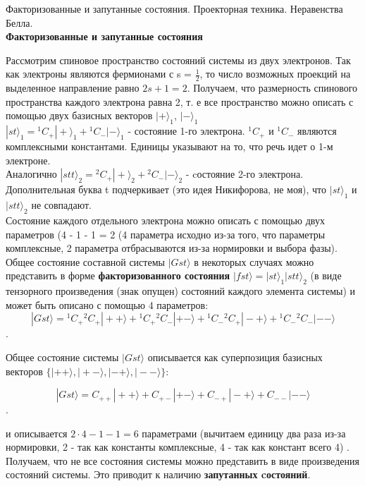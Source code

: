 \documentclass[__main__.tex]{subfiles}
\begin{document}
Факторизованные и запутанные состояния. Проекторная техника. Неравенства Белла.\\ 

\textbf{Факторизованные и запутанные состояния}

Рассмотрим спиновое пространство состояний системы из двух электронов. Так как электроны являются фермионами с s = $\frac{1}{2}$, то число возможных проекций на выделенное направление равно $2s + 1 = 2$. Получаем, что размерность спинового пространства каждого электрона равна 2, т. е все пространство можно описать с помощью двух базисных векторов $|+\rangle_1$, $|-\rangle_1$\\

$|st\rangle_1 = {}^1 C_{+} |+\rangle_1 + {}^1 C_{-} |-\rangle_1$ - состояние 1-го электрона. ${}^1 C_{+}$ и ${}^1 C_{-}$ являются комплексными константами. Единицы указывают на то, что речь идет о 1-м электроне. \\

Аналогично $|stt\rangle_2 = {}^2 C_{+} |+\rangle_2 + {}^2 C_{-} |-\rangle_2$ - cостояние 2-го электрона. Дополнительная буква t подчеркивает (это идея Никифорова, не моя), что $|st\rangle_1$ и $|stt\rangle_2$ не совпадают.\\

Состояние каждого отдельного электрона можно описать с помощью двух параметров (4 - 1 - 1 = 2 (4 параметра исходно из-за того, что параметры комплексные, 2 параметра отбрасываются из-за нормировки и выбора фазы). \\

Общее состояние составной системы $|Gst\rangle$ в некоторых случаях можно представить в форме \textbf{факторизованного состояния} $|fst\rangle = |st\rangle_1 |stt\rangle_2$ (в виде тензорного произведения (знак опущен) состояний каждого элемента системы) и может быть описано с помощью 4 параметров:\\

$$|Gst\rangle = {}^1C_{+}{}^2C_{+}|++\rangle + {}^1C_{+}{}^2C_{-}|+-\rangle + {}^1C_{-}{}^2C_{+}|-+\rangle + {}^1C_{-}{}^2C_{-}|--\rangle$$.

Общее состояние системы $|Gst\rangle$ описывается как суперпозиция базисных векторов $\lbrace |++\rangle, |+-\rangle, |-+\rangle, |--\rangle \rbrace$:

$$|Gst\rangle = C_{++}|++\rangle + C_{+-}|+-\rangle + C_{-+}|-+\rangle + C_{--}|--\rangle$$.

и описывается $2 \cdot 4 - 1 - 1 = 6$ параметрами (вычитаем единицу два раза из-за нормировки, 2 - так как константы комплексные, 4 - так как констант всего 4) . Получаем, что не все состояния системы можно представить в виде произведения состояний системы. Это приводит к наличию \textbf{запутанных cостояний}.\\
\end{document}
